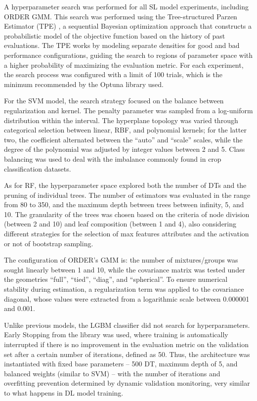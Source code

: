 A hyperparameter search was performed for all SL model experiments, including \ac{ORDER} \ac{GMM}. This search was performed using the Tree-structured Parzen Estimator (TPE) \citep{watanabe2025treestructuredparzenestimatorunderstanding}, a sequential Bayesian optimization approach that constructs a probabilistic model of the objective function based on the history of past evaluations. The TPE works by modeling separate densities for good and bad performance configurations, guiding the search to regions of parameter space with a higher probability of maximizing the evaluation metric. For each experiment, the search process was configured with a limit of 100 trials, which is the minimum recommended by the Optuna library used.

For the \ac{SVM} model, the search strategy focused on the balance between regularization and kernel. The penalty parameter  was sampled from a log-uniform distribution within the interval. The hyperplane topology was varied through categorical selection between linear, RBF, and polynomial kernels; for the latter two, the coefficient alternated between the ``auto'' and ``scale'' scales, while the degree of the polynomial was adjusted by integer values between 2 and 5. Class balancing was used to deal with the imbalance commonly found in crop classification datasets.

As for \ac{RF}, the hyperparameter space explored both the number of \ac{DT}s and the pruning of individual trees. The number of estimators was evaluated in the range from 80 to 350, and the maximum depth between trees between infinity, 5, and 10. The granularity of the trees was chosen based on the criteria of node division (between 2 and 10) and leaf composition (between 1 and 4), also considering different strategies for the selection of max features attributes and the activation or not of bootstrap sampling.

The configuration of \ac{ORDER}'s \ac{GMM} is: the number of mixtures/groups was sought linearly between 1 and 10, while the covariance matrix was tested under the geometries ``full'', ``tied'', ``diag'', and ``spherical''. To ensure numerical stability during estimation, a regularization term was applied to the covariance diagonal, whose values were extracted from a logarithmic scale between 0.000001 and 0.001.

Unlike previous models, the \ac{LGBM} classifier did not search for hyperparameters. Early Stopping from the library was used, where training is automatically interrupted if there is no improvement in the evaluation metric on the validation set after a certain number of iterations, defined as 50. Thus, the architecture was instantiated with fixed base parameters -- 500 DT, maximum depth of 5, and balanced weights (similar to SVM) -- with the number of iterations and overfitting prevention determined by dynamic validation monitoring, very similar to what happens in DL model training.

